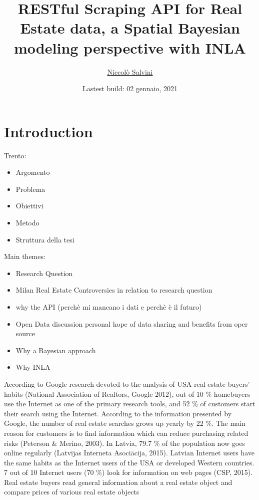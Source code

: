 \documentclass[
  12pt,
  a4paper,
  oneside]{book}
\title{RESTful Scraping API for Real Estate data, a Spatial Bayesian modeling perspective with INLA}
\author{\href{https://niccolosalvini.netlify.app/}{Niccolò Salvini}}
\date{Lastest build: 02 gennaio, 2021}
\providecommand{\tightlist}{%
  \setlength{\itemsep}{0pt}\setlength{\parskip}{0pt}}
\let\oldmaketitle\maketitle
\theoremstyle{definition}
\theoremstyle{definition}
\theoremstyle{definition}
\theoremstyle{remark}
\begin{document}
\maketitle


\newpage

\let\maketitle\oldmaketitle
\maketitle

{
\setcounter{tocdepth}{2}
\tableofcontents
}
\listoftables
\listoffigures
{}
\hypertarget{intro}{%
\chapter{Introduction}\label{intro}}

Trento:

\begin{itemize}
\tightlist
\item
  Argomento
\item
  Problema
\item
  Obiettivi
\item
  Metodo
\item
  Struttura della tesi
\end{itemize}

Main themes:

\begin{itemize}
\tightlist
\item
  Research Question
\item
  Milan Real Estate Controversies in relation to research question
\item
  why the API (perchè mi mancano i dati e perchè è il futuro)
\item
  Open Data discussion personal hope of data sharing and benefits from oper source
\item
  Why a Bayesian approach
\item
  Why INLA
\end{itemize}

According to Google research devoted to the analysis of USA real estate
buyers' habits (National Association of Realtors, Google 2012), out of 10 \%
homebuyers use the Internet as one of the primary research tools, and 52 \% of
customers start their search using the Internet. According to the information
presented by Google, the number of real estate searches grows up yearly by 22 \%.
The main reason for customers is to find information which can reduce purchasing
related risks (Peterson \& Merino, 2003).
In Latvia, 79.7 \% of the population now goes online regularly (Latvijas
Interneta Asociācija, 2015). Latvian Internet users have the same habits as the
Internet users of the USA or developed Western countries. 7 out of 10 Internet
users (70 \%) look for information on web pages (CSP, 2015). Real estate buyers
read general information about a real estate object and compare prices of various
real estate objects
\end{document}
